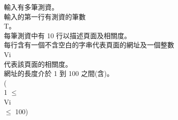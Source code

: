 輸入有多筆測資。\\
輸入的第一行有測資的筆數\\
T。\\
每筆測資中有 10 行以描述頁面及相關度。\\
每行含有一個不含空白的字串代表頁面的網址及一個整數\\
Vi\\
代表該頁面的相關度。\\
網址的長度介於 1 到 100 之間(含)。\\
(\\
1 $\leq$\\
Vi \\
$\leq$ 100)